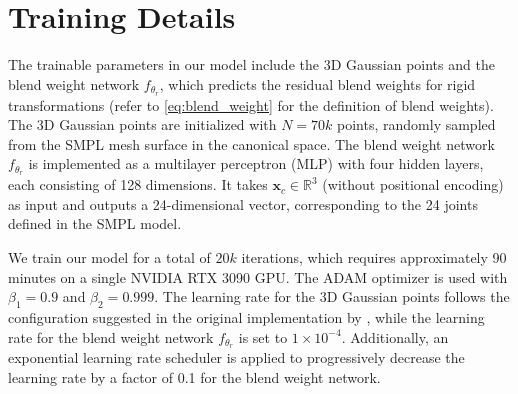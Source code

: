 \clearpage
\setcounter{page}{1}
\setcounter{section}{0}
\setcounter{table}{0}
\setcounter{figure}{0}
\maketitlesupplementary



\section{Training Details}

The trainable parameters in our model include the 3D Gaussian points and the blend weight network $f_{\theta_r}$, which predicts the residual blend weights for rigid transformations (refer to \eqref{eq:blend_weight} for the definition of blend weights).
The 3D Gaussian points are initialized with $N = 70k$ points, randomly sampled from the SMPL mesh surface in the canonical space.
The blend weight network $f_{\theta_r}$ is implemented as a multilayer perceptron (MLP) with four hidden layers, each consisting of 128 dimensions. It takes $\mathbf{x}_c \in \mathbb{R}^3$ (without positional encoding) as input and outputs a 24-dimensional vector, corresponding to the 24 joints defined in the SMPL model.

We train our model for a total of $20k$ iterations, which requires approximately 90 minutes on a single NVIDIA RTX 3090 GPU. 
The ADAM optimizer is used with $\beta_1 = 0.9$ and $\beta_2 = 0.999$. 
The learning rate for the 3D Gaussian points follows the configuration suggested in the original implementation by \cite{qian20233dgs}, while the learning rate for the blend weight network $f_{\theta_r}$ is set to $1 \times 10^{-4}$.  
Additionally, an exponential learning rate scheduler is applied to progressively decrease the learning rate by a factor of 0.1 for the blend weight network.

